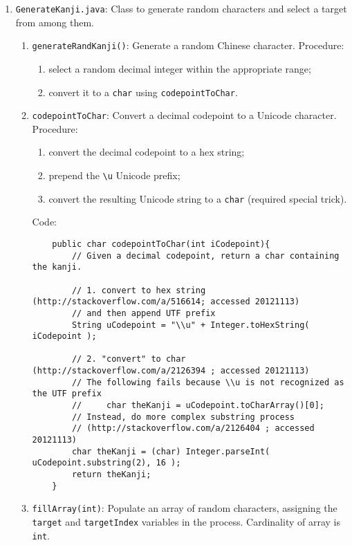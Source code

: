 \documentclass[11pt,asymmetric]{article}
\begin{document}
\begin{enumerate}
\begin{enumerate}
	\end{enumerate}

\item \texttt{GenerateKanji.java}: Class to generate random characters and select a target from among them.\begin{enumerate}
	\item \texttt{generateRandKanji()}: Generate a random Chinese character. Procedure:\begin{enumerate}
		\item select a random decimal integer within the appropriate range;
		\item convert it to a \texttt{char} using \texttt{codepointToChar}.
		\end{enumerate}
	
	\item \texttt{codepointToChar}: Convert a decimal codepoint to a Unicode character. Procedure:\begin{enumerate}
		\item convert the decimal codepoint to a hex string;
		\item prepend the \texttt{\textbackslash u} Unicode prefix;
		\item convert the resulting Unicode string to a \texttt{char} (required special trick).
		\end{enumerate}
Code:\begin{lstlisting}
	public char codepointToChar(int iCodepoint){
		// Given a decimal codepoint, return a char containing the kanji.
		
		// 1. convert to hex string (http://stackoverflow.com/a/516614; accessed 20121113)
		// and then append UTF prefix 
		String uCodepoint = "\\u" + Integer.toHexString( iCodepoint );

		// 2. "convert" to char (http://stackoverflow.com/a/2126394 ; accessed 20121113)
		// The following fails because \\u is not recognized as the UTF prefix
		//     char theKanji = uCodepoint.toCharArray()[0];
		// Instead, do more complex substring process
		// (http://stackoverflow.com/a/2126404 ; accessed 20121113)
		char theKanji = (char) Integer.parseInt( uCodepoint.substring(2), 16 );
		return theKanji;
	}
\end{lstlisting}


	\item \texttt{fillArray(int)}: Populate an array of random characters, assigning the \texttt{target} and \texttt{targetIndex} variables in the process. Cardinality of array is \texttt{int}.
	\end{enumerate}

\end{enumerate}
\end{document}
